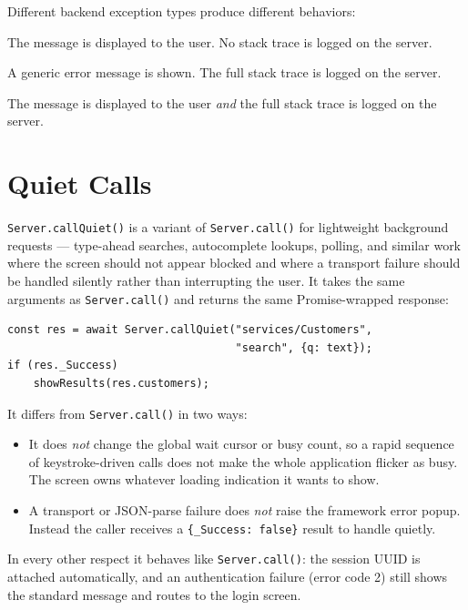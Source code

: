 \noindent
Different backend exception types produce different behaviors:

\begin{description}[style=nextline]
  \item[\texttt{UserException}] The message is displayed to the user.  No stack trace is logged on the server.
  \item[\texttt{ServerException}] A generic error message is shown.  The full stack trace is logged on the server.
  \item[\texttt{LogException}] The message is displayed to the user \emph{and} the full stack trace is logged on the server.
\end{description}

\section{Quiet Calls}
\label{sec:sc-quiet}

\texttt{Server.callQuiet()} is a variant of \texttt{Server.call()} for lightweight background requests --- type-ahead searches, autocomplete lookups, polling, and similar work where the screen should not appear blocked and where a transport failure should be handled silently rather than interrupting the user.  It takes the same arguments as \texttt{Server.call()} and returns the same Promise-wrapped response:

\begin{lstlisting}[style=javascript]
const res = await Server.callQuiet("services/Customers",
                                   "search", {q: text});
if (res._Success)
    showResults(res.customers);
\end{lstlisting}

\noindent
It differs from \texttt{Server.call()} in two ways:

\begin{itemize}
  \item It does \emph{not} change the global wait cursor or busy count, so a rapid sequence of keystroke-driven calls does not make the whole application flicker as busy.  The screen owns whatever loading indication it wants to show.
  \item A transport or JSON-parse failure does \emph{not} raise the framework error popup.  Instead the caller receives a \texttt{\{\_Success: false\}} result to handle quietly.
\end{itemize}

\noindent
In every other respect it behaves like \texttt{Server.call()}: the session UUID is attached automatically, and an authentication failure (error code 2) still shows the standard message and routes to the login screen.

